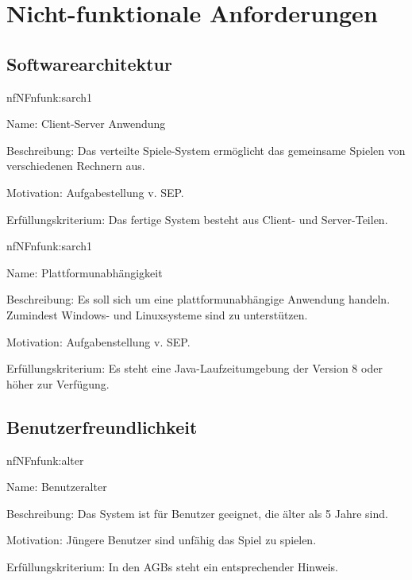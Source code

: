 \chapter{Nicht-funktionale Anforderungen}

\setcounter{nf}{10}

\section{Softwarearchitektur}

\begin{description}[leftmargin=5em, style=sameline]	
	\begin{lhp}{nf}{NF}{nfunk:sarch1}
		\item [Name:] Client-Server Anwendung
		\item [Beschreibung:] Das verteilte Spiele-System ermöglicht das gemeinsame Spielen von verschiedenen Rechnern aus.
		\item [Motivation:] Aufgabestellung v. SEP.
		\item [Erfüllungskriterium:] Das fertige System besteht aus Client- und Server-Teilen.
	\end{lhp}
	
	\begin{lhp}{nf}{NF}{nfunk:sarch1}
		\item [Name:] Plattformunabhängigkeit
		\item [Beschreibung:] Es soll sich um eine plattformunabhängige Anwendung handeln. Zumindest Windows- und Linuxsysteme sind zu unterstützen.
		\item [Motivation:] Aufgabenstellung v. SEP.
		\item [Erfüllungskriterium:] Es steht eine Java-Laufzeitumgebung der Version 8 oder höher zur Verfügung.
	\end{lhp}
\end{description}



\section{Benutzerfreundlichkeit}


\begin{description}[leftmargin=5em, style=sameline]	
	\begin{lhp}{nf}{NF}{nfunk:alter}
		\item [Name:] Benutzeralter
		\item [Beschreibung:] Das System ist für Benutzer geeignet, die älter als 5 Jahre sind.
		\item [Motivation:] Jüngere Benutzer sind unfähig das Spiel zu spielen.
		\item [Erfüllungskriterium:] In den AGBs steht ein entsprechender Hinweis.
	\end{lhp}
\end{description}

